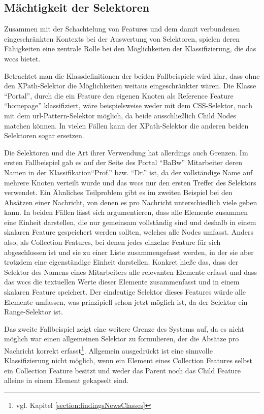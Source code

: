 \subsection{Mächtigkeit der Selektoren}
    \label{section:discussionInterpretationSelectors}
    Zusammen mit der Schachtelung von Features und dem
    damit verbundenen eingeschränkten Kontexts bei der
    Auswertung von Selektoren,
    spielen deren Fähigkeiten eine zentrale Rolle bei den
    Möglichkeiten der Klassifizierung, die das \gls{wccs} bietet.

    Betrachtet man die Klassdefinitionen der beiden Fallbeispiele wird klar,
    dass ohne den XPath-Selektor die Möglichkeiten weitaus eingeschränkter wären.
    Die Klasse "`Portal"', durch die ein Feature den eigenen Knoten
    als Reference Feature "`homepage"' klassifiziert,
    wäre beispielsweise weder mit dem CSS-Selektor,
    noch mit dem \gls{url}-Pattern-Selektor möglich,
    da beide ausschließlich Child Nodes matchen können.
    In vielen Fällen kann der XPath-Selektor die anderen beiden Selektoren sogar ersetzen.
    
    Die Selektoren und die Art ihrer Verwendung hat allerdings auch Grenzen.
    Im ersten Fallbeispiel gab es auf der Seite des Portal "`BaBw"'
    Mitarbeiter deren Namen in der Klassifikation"`Prof."' bzw. "`Dr."' ist,
    da der vollständige Name auf mehrere Knoten verteilt wurde
    und das \gls{wccs} nur den ersten Treffer des Selektors verwendet.
    Ein Ähnliches Teilproblem gibt es im zweiten Beispiel bei den Absätzen einer Nachricht,
    von denen es pro Nachricht unterschiedlich viele geben kann.
    In beiden Fällen lässt sich argumentieren,
    dass alle Elemente zusammen eine Einheit darstellen,
    die nur gemeinsam vollständig sind und deshalb
    in einem skalaren Feature gespeichert werden sollten,
    welches alle Nodes umfasst.
    Anders also, als Collection Features,
    bei denen jedes einzelne Feature für sich abgeschlossen ist
    und sie zu einer Liste zusammengefasst werden,
    in der sie aber trotzdem eine eigenständige Einheit darstellen.
    Konkret hieße das, dass der Selektor des Namens eines Mitarbeiters
    alle relevanten Elemente erfasst und
    dass das \gls{wccs} die textuellen Werte dieser Elemente zusammenfasst
    und in einem skalaren Feature speichert.
    Der eindeutige Selektor dieses Features würde alle Elemente umfassen,
    was prinzipiell schon jetzt möglich ist,
    da der Selektor ein Range-Selektor ist.

    Das zweite Fallbeispiel zeigt eine weitere Grenze des Systems auf,
    da es nicht möglich war einen allgemeinen Selektor zu formulieren,
    der die Absätze pro Nachricht korrekt
    erfasst\footnote{vgl. Kapitel \ref{section:findingsNewsClasses}}.
    Allgemein ausgedrückt ist eine sinnvolle Klassifizierung nicht möglich,
    wenn ein Element eines Collection Features selbst ein Collection Feature besitzt
    und weder das Parent noch das Child Feature alleine in einem Element gekapselt sind.
